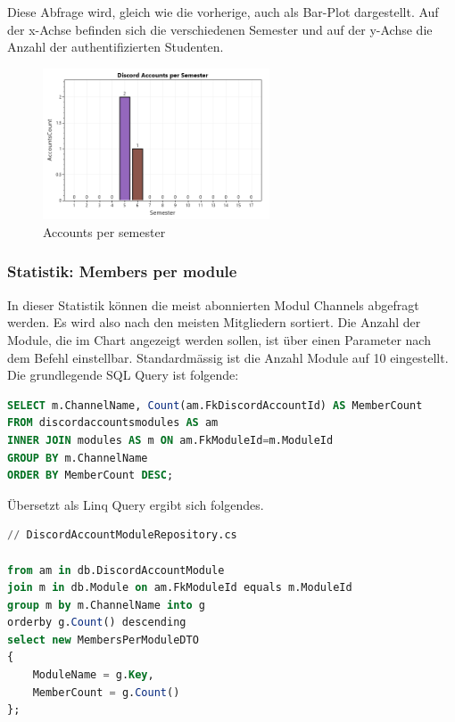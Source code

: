 \documentclass[a4paper, table]{article}
\begin{document}
Diese Abfrage wird, gleich wie die vorherige, auch als Bar-Plot dargestellt. 
Auf der x-Achse befinden sich die verschiedenen Semester und auf der y-Achse die Anzahl der authentifizierten Studenten.

\begin{figure}[h]
    \centering
    \includegraphics[width=0.6\textwidth]{img/accountsPerSemester.png}
    \caption{Accounts per semester}
    \label{fig:accounts-per-semester}
\end{figure}

\clearpage
\subsubsection*{Statistik: Members per module}
In dieser Statistik können die meist abonnierten Modul Channels abgefragt werden.
Es wird also nach den meisten Mitgliedern sortiert. 
Die Anzahl der Module, die im Chart angezeigt werden sollen, ist über einen Parameter nach dem Befehl einstellbar.
Standardmässig ist die Anzahl Module auf 10 eingestellt.\\
Die grundlegende SQL Query ist folgende:

\begin{lstlisting}[language=SQL]
SELECT m.ChannelName, Count(am.FkDiscordAccountId) AS MemberCount
FROM discordaccountsmodules AS am 
INNER JOIN modules AS m ON am.FkModuleId=m.ModuleId
GROUP BY m.ChannelName
ORDER BY MemberCount DESC;
\end{lstlisting}

Übersetzt als Linq Query ergibt sich folgendes.

\begin{lstlisting}[language=SQL]
// DiscordAccountModuleRepository.cs

from am in db.DiscordAccountModule
join m in db.Module on am.FkModuleId equals m.ModuleId
group m by m.ChannelName into g
orderby g.Count() descending
select new MembersPerModuleDTO
{
    ModuleName = g.Key,
    MemberCount = g.Count()
};
\end{lstlisting}
\end{document}
